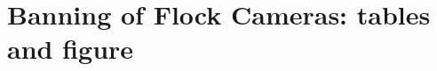 \documentclass{article}
\begin{document}
\section*{Banning of Flock Cameras: tables and figure}
\label{tab:descriptives}





\end{document}
